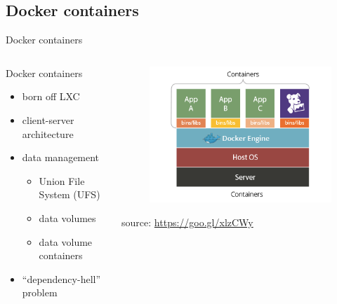 \subsection{Docker containers}
\begin{frame}{Docker containers}
	\only<1>
	{
		\begin{columns}
			\begin{column}{0.5\textwidth}
				Docker containers
				\begin{itemize}
					\item{\footnotesize{born off LXC}}
					\item{\footnotesize{client-server architecture}}
					\item{\footnotesize{data management}}
					\begin{itemize}
						\item{\scriptsize{Union File System (UFS)}}
						\item{\scriptsize{data volumes}}
						\item{\scriptsize{data volume containers}}
					\end{itemize}
					\item{\footnotesize{``dependency-hell'' problem}}
				\end{itemize}
			\end{column}
			\begin{column}{0.5\textwidth}
				\begin{figure}
					\centering{}
					\includegraphics[scale=0.35]{images/docker-containers.png}
				\end{figure}
				\begin{flushright}
					\tiny{source: \url{https://goo.gl/xlzCWy}}
				\end{flushright}
			\end{column}
		\end{columns}
}
\end{frame}
